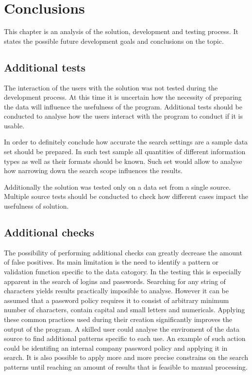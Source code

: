 \documentclass[a4paper,twoside,12pt]{book}
\begin{document}
\chapter{Conclusions}

This chapter is an analysis of the solution, development and testing process. It states the possible future development goals and conclusions on the topic.

\section{Additional tests}

The interaction of the users with the solution was not tested during the development process.
At this time it is uncertain how the necessity of preparing the data will influence the usefulness
of the program. Additional tests should be conducted to analyse how the users interact with the
program to conduct if it is usable. 

In order to definitely conclude how accurate the search settings are a sample data set should be prepared.
In such test sample all quantities of different information types as well as their formats should be known.
Such set would allow to analyse how narrowing down the search scope influences the results.

Additionally the solution was tested only on a data set from a single source. Multiple source 
tests should be conducted to check how different cases impact the usefulness of solution. 

\section{Additional checks}

The possibility of performing additional checks can greatly decrease the amount of false positives.
Its main limitation is the need to identify a pattern or validation function specific to the data catogory.
In the testing this is especially apparent in the search of logins and passwords. Searching for any string 
of characters yields results practically imposible to analyse. However it can be assumed that a password policy
requires it to consist of arbitrary minimum number of characters, contain capital and small letters and numericals.
Applying these common practices used during their creation significantly improves the output of the program. 
A skilled user could analyse the enviroment of the data source to find additional patterns specific to each use.
An example of such action could be identifing an internal company password policy and applying it in search.
It is also possible to apply more and more precise constrains on the search patterns until reaching an amount of 
results that is feasible to manual processing. 
\end{document}

